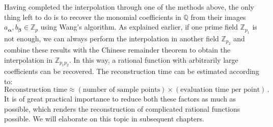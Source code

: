 \documentclass[main.tex]{subfiles}
\begin{document}
Having completed the interpolation through one of the methods above, the only thing left to do is to recover the monomial coefficients in $\mathbb{Q}$ from their images $a_{\bm{\alpha}}, b_{\bm{\beta}} \in \mathbb{Z}_p$ using Wang's algorithm. As explained earlier, if one prime field $\mathbb{Z}_{p_1}$ is not enough, we can always perform the interpolation in another field $\mathbb{Z}_{p_2}$ and combine these results with the Chinese remainder theorem to obtain the interpolation in $\mathbb{Z}_{p_1 p_2}$. In this way, a rational function with arbitrarily large coefficients can be recovered. The reconstruction time can be estimated according to:
\begin{equation} \label{eq:rectimeschematic}
    \text{Reconstruction time} \approx (\text{number of sample points}) \times (\text{evaluation time per point})\,.
\end{equation}
It is of great practical importance to reduce both these factors as much as possible, which renders the reconstruction of complicated rational functions possible. We will elaborate on this topic in subsequent chapters.
\end{document}
